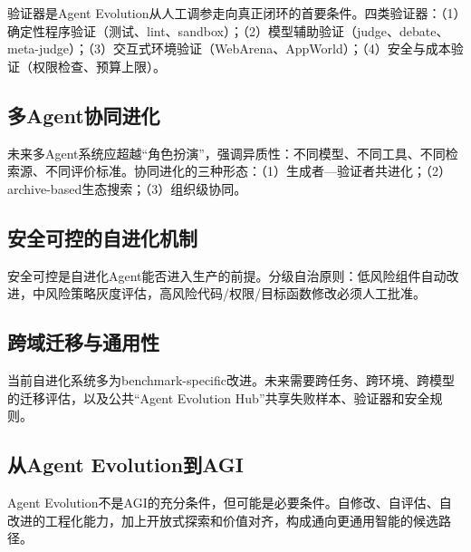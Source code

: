 验证器是Agent Evolution从人工调参走向真正闭环的首要条件。四类验证器：（1）确定性程序验证（测试、lint、sandbox）；（2）模型辅助验证（judge、debate、meta-judge）；（3）交互式环境验证（WebArena、AppWorld）；（4）安全与成本验证（权限检查、预算上限）。

\subsection{多Agent协同进化}

未来多Agent系统应超越``角色扮演''，强调异质性：不同模型、不同工具、不同检索源、不同评价标准。协同进化的三种形态：（1）生成者—验证者共进化；（2）archive-based生态搜索；（3）组织级协同。

\subsection{安全可控的自进化机制}

安全可控是自进化Agent能否进入生产的前提。分级自治原则：低风险组件自动改进，中风险策略灰度评估，高风险代码/权限/目标函数修改必须人工批准。

\subsection{跨域迁移与通用性}

当前自进化系统多为benchmark-specific改进。未来需要跨任务、跨环境、跨模型的迁移评估，以及公共``Agent Evolution Hub''共享失败样本、验证器和安全规则。

\subsection{从Agent Evolution到AGI}

Agent Evolution不是AGI的充分条件，但可能是必要条件。自修改、自评估、自改进的工程化能力，加上开放式探索和价值对齐，构成通向更通用智能的候选路径。
